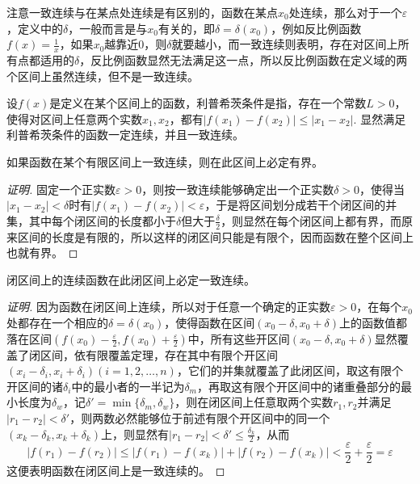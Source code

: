 注意一致连续与在某点处连续是有区别的，函数在某点$x_0$处连续，那么对于一个$\varepsilon$，定义中的$\delta$，一般而言是与$x_0$有关的，即$\delta=\delta(x_0)$，例如反比例函数$f(x)=\frac{1}{x}$，如果$x_0$越靠近0，则$\delta$就要越小，而一致连续则表明，存在对区间上所有点都适用的$\delta$，反比例函数显然无法满足这一点，所以反比例函数在定义域的两个区间上虽然连续，但不是一致连续。

\begin{example}[利普希茨连续]
  设$f(x)$是定义在某个区间上的函数，利普希茨条件是指，存在一个常数$L>0$，使得对区间上任意两个实数$x_1,x_2$，都有$|f(x_1)-f(x_2)| \leqslant |x_1-x_2|$. 显然满足利普希茨条件的函数一定连续，并且一致连续。
\end{example}

\begin{theorem}
  如果函数在某个有限区间上一致连续，则在此区间上必定有界。
\end{theorem}

\begin{proof}[证明]
  固定一个正实数$\varepsilon>0$，则按一致连续能够确定出一个正实数$\delta>0$，使得当$|x_1-x_2|<\delta$时有$|f(x_1)-f(x_2)|<\varepsilon$，于是将区间划分成若干个闭区间的并集，其中每个闭区间的长度都小于$\delta$但大于$\frac{\delta}{2}$，则显然在每个闭区间上都有界，而原来区间的长度是有限的，所以这样的闭区间只能是有限个，因而函数在整个区间上也就有界。
\end{proof}

\begin{theorem}
  闭区间上的连续函数在此闭区间上必定一致连续。
\end{theorem}

\begin{proof}[证明]
  因为函数在闭区间上连续，所以对于任意一个确定的正实数$\varepsilon>0$，在每个$x_0$处都存在一个相应的$\delta=\delta(x_0)$，使得函数在区间$(x_0-\delta,x_0+\delta)$上的函数值都落在区间$(f(x_0)-\frac{\varepsilon}{2},f(x_0)+\frac{\varepsilon}{2})$中，所有这些开区间$(x_0-\delta,x_0+\delta)$显然覆盖了闭区间，依有限覆盖定理，存在其中有限个开区间$(x_i-\delta_i,x_i+\delta_i)(i=1,2,\ldots,n)$，它们的并集就覆盖了此闭区间，取这有限个开区间的诸$\delta_i$中的最小者的一半记为$\delta_m$，再取这有限个开区间中的诸重叠部分的最小长度为$\delta_w$，记$\delta'=\min\{\delta_m,\delta_w\}$，则在闭区间上任意取两个实数$r_1,r_2$并满足$|r_1-r_2|<\delta'$，则两数必然能够位于前述有限个开区间中的同一个$(x_k-\delta_k,x_k+\delta_k)$上，则显然有$|r_1-r_2|<\delta'\leqslant \frac{\delta_k}{2}$，从而
  \[ |f(r_1)-f(r_2)| \leqslant |f(r_1)-f(x_k)|+|f(r_2)-f(x_k)|< \frac{\varepsilon}{2}+\frac{\varepsilon}{2} = \varepsilon \]
  这便表明函数在闭区间上是一致连续的。
\end{proof}

